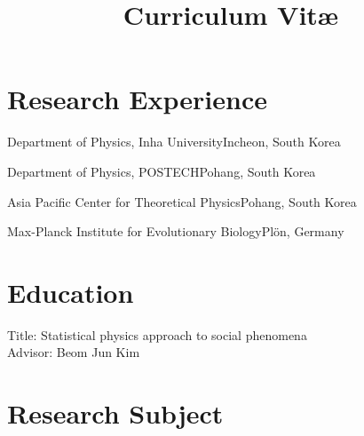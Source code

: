 \documentclass[11pt,a4paper,sans]{moderncv}        %
\title{Curriculum Vitæ}                               %
\begin{document}
\makecvtitle

\section{Research Experience}
{Department of Physics, Inha University}{Incheon, South Korea}{}{}

{Department of Physics, POSTECH}{Pohang, South Korea}{}{}

{Asia Pacific Center for Theoretical Physics}{Pohang, South Korea}{}{}

{Max-Planck Institute for Evolutionary Biology}{Pl\"on, Germany}{}{}

\section{Education}
{Title: Statistical physics approach to social phenomena \\Advisor: Beom Jun Kim}  %



\section{Research Subject}
\end{document}
